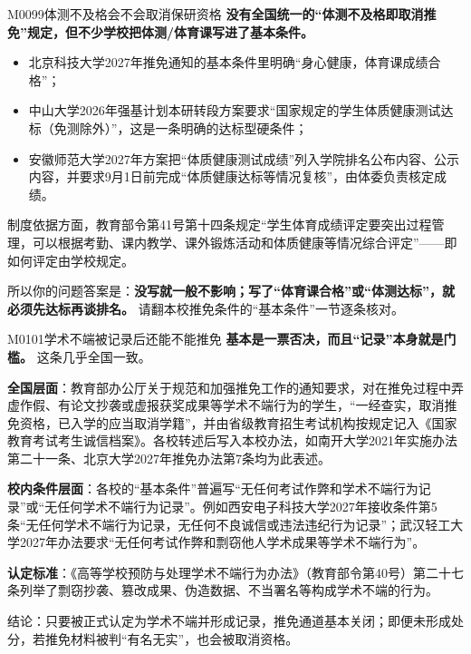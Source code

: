 \begin{qa}{M0099}{体测不及格会不会取消保研资格}
\textbf{没有全国统一的“体测不及格即取消推免”规定，但不少学校把体测/体育课写进了基本条件。}

\begin{itemize}
  \item 北京科技大学2027年推免通知的基本条件里明确“身心健康，体育课成绩合格”；
  \item 中山大学2026年强基计划本研转段方案要求“国家规定的学生体质健康测试达标（免测除外）”，这是一条明确的达标型硬条件；
  \item 安徽师范大学2027年方案把“体质健康测试成绩”列入学院排名公布内容、公示内容，并要求9月1日前完成“体质健康达标等情况复核”，由体委负责核定成绩。
\end{itemize}

制度依据方面，教育部令第41号第十四条规定“学生体育成绩评定要突出过程管理，可以根据考勤、课内教学、课外锻炼活动和体质健康等情况综合评定”——即如何评定由学校规定。

所以你的问题答案是：\textbf{没写就一般不影响；写了“体育课合格”或“体测达标”，就必须先达标再谈排名。} 请翻本校推免条件的“基本条件”一节逐条核对。
\end{qa}

\begin{qa}{M0101}{学术不端被记录后还能不能推免}
\textbf{基本是一票否决，而且“记录”本身就是门槛。} 这条几乎全国一致。

\textbf{全国层面}：教育部办公厅关于规范和加强推免工作的通知要求，对在推免过程中弄虚作假、有论文抄袭或虚报获奖成果等学术不端行为的学生，“一经查实，取消推免资格，已入学的应当取消学籍”，并由省级教育招生考试机构按规定记入《国家教育考试考生诚信档案》。各校转述后写入本校办法，如南开大学2021年实施办法第二十一条、北京大学2027年推免办法第7条均为此表述。

\textbf{校内条件层面}：各校的“基本条件”普遍写“无任何考试作弊和学术不端行为记录”或“无任何学术不端行为记录”。例如西安电子科技大学2027年接收条件第5条“无任何学术不端行为记录，无任何不良诚信或违法违纪行为记录”；武汉轻工大学2027年办法要求“无任何考试作弊和剽窃他人学术成果等学术不端行为”。

\textbf{认定标准}：《高等学校预防与处理学术不端行为办法》（教育部令第40号）第二十七条列举了剽窃抄袭、篡改成果、伪造数据、不当署名等构成学术不端的行为。

结论：只要被正式认定为学术不端并形成记录，推免通道基本关闭；即便未形成处分，若推免材料被判“有名无实”，也会被取消资格。
\end{qa}

